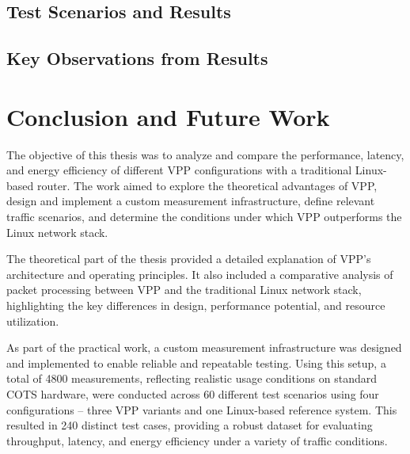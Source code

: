 \section{Test Scenarios and Results}





\newpage
\section{Key Observations from Results}



\chapter{Conclusion and Future Work}
The objective of this thesis was to analyze and compare the performance, latency, and energy efficiency of different VPP configurations with a traditional Linux-based router. 
The work aimed to explore the theoretical advantages of VPP, design and implement a custom measurement infrastructure, define relevant traffic scenarios, 
and determine the conditions under which VPP outperforms the Linux network stack.

The theoretical part of the thesis provided a detailed explanation of VPP's architecture and operating principles. 
It also included a comparative analysis of packet processing between VPP and the traditional Linux network stack, highlighting the key differences in design, performance potential, and resource utilization.

As part of the practical work, a custom measurement infrastructure was designed and implemented to enable reliable and repeatable testing. 
Using this setup, a total of 4800 measurements, reflecting realistic usage conditions on standard COTS hardware, 
were conducted across 60 different test scenarios using four configurations -- three VPP variants and one Linux-based reference system.
This resulted in 240 distinct test cases, providing a robust dataset for evaluating throughput, latency, and energy efficiency under a variety of traffic conditions.


